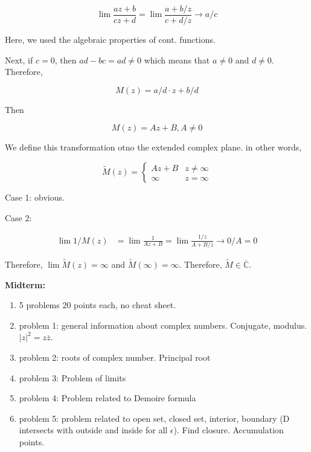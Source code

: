\documentclass{article}
\newtheorem{one minute paper}[theorem]{One Minute Paper}
\begin{document}
\begin{equation}
    \lim \frac{az + b}{cz + d} = \lim \frac{a + b/z}{c + d/z} \rightarrow a/c
\end{equation}

Here, we used the algebraic properties of cont. functions.  

Next, if $c = 0$, then $ad - bc = ad \neq 0$ which means that $a \neq 0$ and $d \neq 0$. Therefore, 

\begin{equation}
    M(z) = a/d \cdot z + b/d
\end{equation}

Then 

\begin{equation}
    M(z) = A z + B, A \neq 0
\end{equation}

We define this transformation otno the extended complex plane. in other words, 

\begin{equation}
    \tilde{M}(z) = \begin{cases}
        Az + B  & z \neq \infty\\
        \infty & z = \infty
    \end{cases}
\end{equation}

Case 1: obvious. 

Case 2:

\begin{align}
    \lim 1/M(z) &= \lim \frac{1}{Az + B}  = \lim \frac{1/z}{A + B/z} \rightarrow 0/A = 0
\end{align}

Therefore, $\lim \tilde{M}(z) = \infty$ and $\tilde{M}(\infty) = \infty$. Therefore, $\tilde{M} \in \overline{\mathbb{C}}$.

\textbf{Midterm:}
\begin{enumerate}
    \item 5 problems 20 points each, no cheat sheet. 
    \item problem 1: general information about complex numbers. Conjugate, modulus. $|z|^2 = z \overline{z}$. 
    \item problem 2: roots of complex number. Principal root
    \item problem 3: Problem of limits
    \item problem 4: Problem related to Demoire formula
    \item problem 5: problem related to open set, closed set, interior, boundary (D intersects with outside and inside for all $\epsilon$). Find closure. Accumulation points. 
\end{enumerate}
\end{document}
